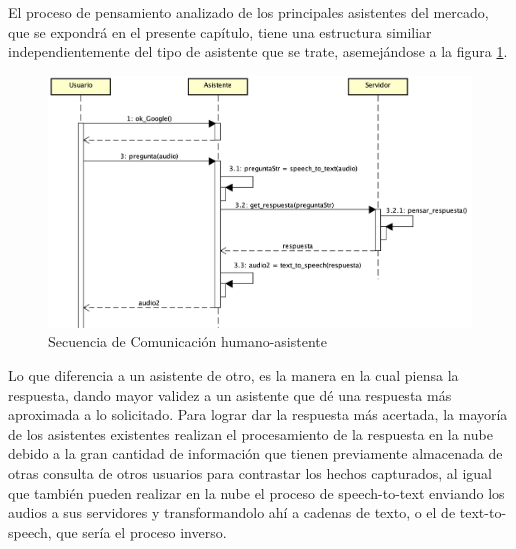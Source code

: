 El proceso de pensamiento analizado de los principales asistentes del mercado, que se expondrá en el presente capítulo, tiene una estructura similiar independientemente del tipo de asistente que se trate, asemejándose a la figura \ref{fig:humasseq}.

\begin{figure}[h!]
    \centering
    \includegraphics[width=13cm]{./img/sequence/humasseq.png}
    \caption{Secuencia de Comunicación humano-asistente}
    \label{fig:humasseq}
\end{figure}

Lo que diferencia a un asistente de otro, es la manera en la cual piensa la respuesta, dando mayor validez a un asistente que dé una respuesta más aproximada a lo solicitado.
Para lograr dar la respuesta más acertada, la mayoría de los asistentes existentes realizan el procesamiento de la respuesta en la nube debido a la gran cantidad de información que tienen previamente almacenada de otras consulta de otros usuarios para contrastar los hechos capturados, al igual que también pueden realizar en la nube el proceso de speech-to-text enviando los audios a sus servidores y transformandolo ahí a cadenas de texto, o el de text-to-speech, que sería el proceso inverso.
